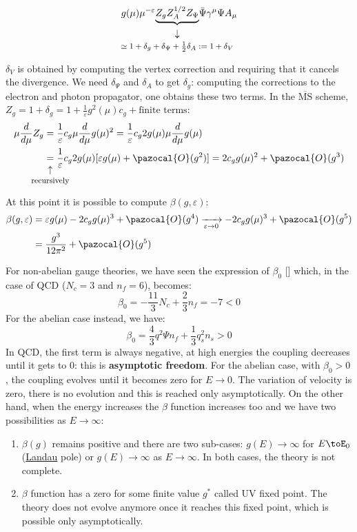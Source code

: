 \documentclass[../main.tex]{subfiles}
\begin{document}
\begin{example}
\[
g(\mu)\mu^{-\varepsilon}\underset{\mathclap{\tikz \node {$\downarrow$} node [below=1ex] {\footnotesize $\simeq1+\delta_g+\delta_\Psi+\frac{1}{2}\delta_A:=1+\delta_V$ };}}{\underbrace{Z_gZ_A^{1/2}Z_\Psi}}\Bar{\Psi}\gamma^\mu\Psi A_\mu
\]
$\delta_V$ is obtained by computing the vertex correction and requiring that it cancels the divergence. We need $\delta_\Psi$ and $\delta_A$ to get $\delta_g$: computing the corrections to the electron and photon propagator, one obtains these two terms. In the $\overline{\text{MS}}$ scheme, $Z_g=1+\delta_g=1+\frac{1}{\varepsilon}g^2(\mu)c_g+\text{finite terms}$:
\begin{align*}
\mu\frac{d}{d\mu}Z_g&=\frac{1}{\varepsilon}c_g\mu\frac{d}{d\mu}g(\mu)^2=\frac{1}{\varepsilon}c_g2g(\mu)\mu\frac{d}{d\mu}g(\mu)\\
&\underset{\mathclap{\tikz \node {$\uparrow$} node [below=1ex] {\footnotesize recursively};}}{=}\frac{1}{\varepsilon}c_g2g(\mu)[\varepsilon g(\mu)+\pazocal{O}(g^2)]=2c_gg(\mu)^2+\pazocal{O}(g^3)
\end{align*}
At this point it is possible to compute $\beta(g,\varepsilon)$:
\begin{align*}
\beta(g,\varepsilon)&=\varepsilon g(\mu)-2c_gg(\mu)^3+\pazocal{O}(g^4)\xrightarrow[\varepsilon\to0]{}-2c_gg(\mu)^3+\pazocal{O}(g^5)\\
&=\frac{g^3}{12\pi^2}+\pazocal{O}(g^5)
\end{align*}
\end{example}
For non-abelian gauge theories, we have seen the expression of $\beta_0$ [] which, in the case of QCD ($N_c=3$ and $n_f=6$), becomes:
\[
\beta_0=-\frac{11}{3}N_c+\frac{2}{3}n_f=-7<0
\]
For the abelian case instead, we have:
\[
\beta_0=\frac{4}{3}q^2\Psi n_f+\frac{1}{3}q_s^2n_s>0
\]
In QCD, the first term is always negative, at high energies the coupling decreases until it gets to 0: this is \textbf{asymptotic freedom}. For the abelian case, with $\beta_0>0$, the coupling evolves until it becomes zero for $E\to0$. The variation of velocity is zero, there is no evolution and this is reached only asymptotically. On the other hand, when the energy increases the $\beta$ function increases too and we have two possibilities as $E\to\infty$: 
\begin{enumerate}
    \item $\beta(g)$ remains positive and there are two sub-cases: $g(E)\to\infty$ for $E\toE_0$ (\href{https://en.wikipedia.org/wiki/Lev_Landau}{Landau} pole) or $g(E)\to\infty$ as $E\to\infty$. In both cases, the theory is not complete.
    \item $\beta$ function has a zero for some finite value $g^*$ called UV fixed point. The theory does not evolve anymore once it reaches this fixed point, which is possible only asymptotically.
\end{enumerate}
\end{document}
